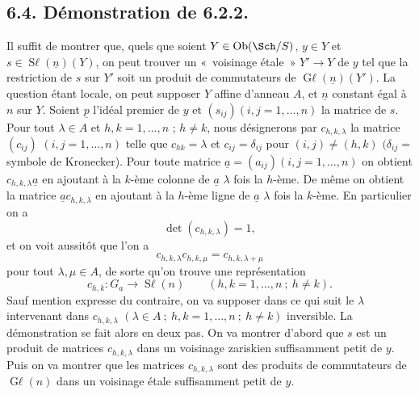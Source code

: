 
\subsection*{6.4. Démonstration de 6.2.2.}
Il suffit de montrer que, quels que soient \(Y\in\operatorname{Ob}(\Sch/S)\), \(y\in Y\) et \(s\in\operatorname{S\ell}(\underline{n})(Y)\), on peut trouver un «~voisinage étale~» \(Y'\to Y\) de \(y\) tel que la restriction de \(s\) sur \(Y'\) soit un produit de commutateurs de \(\operatorname{G\ell}(\underline{n})(Y')\). La question étant locale, on peut supposer \(Y\) affine d'anneau \(A\), et \(\underline{n}\) constant égal à \(n\) sur \(Y\). Soient \(\underline{p}\) l'idéal premier de \(y\) et \((s_{ij})(i,j=1,\ldots,n)\) la matrice de \(s\). Pour tout \(\lambda\in A\) et \(h, k=1,\ldots,n\) ; \(h\ne k\), nous désignerons par \(c_{h,k,\lambda}\) la matrice \((c_{ij})\) \((i,j=1,\ldots,n)\) telle que \(c_{hk}=\lambda\) et \(c_{ij}=\delta_{ij}\) pour \((i,j)\ne(h,k)\) \((\delta_{ij}=\) symbole de Kronecker). Pour toute matrice \(\underline{a}=(a_{ij})(i,j=1,\ldots,n)\) on obtient \(c_{h,k,\lambda}\underline{a}\) en ajoutant à la \(k\)-ème colonne de \(\underline{a}\) \(\lambda\) fois la \(h\)-ème. De même on obtient la matrice \(\underline{a}c_{h,k,\lambda}\) en ajoutant à la \(h\)-ème ligne de \(\underline{a}\) \(\lambda\) fois la \(k\)-ème. En particulier on a
\[
 \det(c_{h,k,\lambda})=1,
\]
et on voit aussitôt que l'on a
\begin{equation}\tag{6.3.1}
 c_{h,k,\lambda}c_{h,k,\mu}=c_{h,k,\lambda+\mu}
\end{equation}
pour tout \(\lambda,\mu\in A\), de sorte qu'on trouve une représentation
\[
 c_{h,k}:G_a\longrightarrow\operatorname{S\ell}(n)
 \qquad(h,k=1,\ldots,n\ ;\ h\ne k).
\]
Sauf mention expresse du contraire, on va supposer dans ce qui suit le \(\lambda\) intervenant dans \(c_{h,k,\lambda}\) \((\lambda\in A\ ;\ h,k=1,\ldots,n\ ;\ h\ne k)\) inversible.
La démonstration se fait alors en deux pas. On va montrer d'abord que \(s\) est un produit de matrices \(c_{h,k,\lambda}\) dans un voisinage zariskien suffisamment petit de \(y\). Puis on va montrer que les matrices \(c_{h,k,\lambda}\) sont des produits de commutateurs de \(\operatorname{G\ell}(n)\) dans un voisinage étale suffisamment petit de \(y\).

